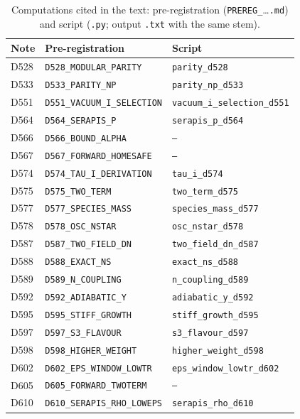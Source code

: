 \documentclass[aps,prd,twocolumn,superscriptaddress,nofootinbib,floatfix]{revtex4-2}
\begin{document}
\begin{table}[tbp]
\caption{Computations cited in the text: pre-registration (\texttt{PREREG\_}\dots\texttt{.md}) and script (\texttt{.py}; output \texttt{.txt} with the same stem).}\label{tab:repro}
\begin{ruledtabular}
\footnotesize
\begin{tabular}{lll}
Note & Pre-registration & Script \\
\hline
D528 & \texttt{D528\_MODULAR\_PARITY} & \texttt{parity\_d528} \\
D533 & \texttt{D533\_PARITY\_NP} & \texttt{parity\_np\_d533} \\
D551 & \texttt{D551\_VACUUM\_I\_SELECTION} & \texttt{vacuum\_i\_selection\_d551} \\
D564 & \texttt{D564\_SERAPIS\_P} & \texttt{serapis\_p\_d564} \\
D566 & \texttt{D566\_BOUND\_ALPHA} & \texttt{---} \\
D567 & \texttt{D567\_FORWARD\_HOMESAFE} & \texttt{---} \\
D574 & \texttt{D574\_TAU\_I\_DERIVATION} & \texttt{tau\_i\_d574} \\
D575 & \texttt{D575\_TWO\_TERM} & \texttt{two\_term\_d575} \\
D577 & \texttt{D577\_SPECIES\_MASS} & \texttt{species\_mass\_d577} \\
D578 & \texttt{D578\_OSC\_NSTAR} & \texttt{osc\_nstar\_d578} \\
D587 & \texttt{D587\_TWO\_FIELD\_DN} & \texttt{two\_field\_dn\_d587} \\
D588 & \texttt{D588\_EXACT\_NS} & \texttt{exact\_ns\_d588} \\
D589 & \texttt{D589\_N\_COUPLING} & \texttt{n\_coupling\_d589} \\
D592 & \texttt{D592\_ADIABATIC\_Y} & \texttt{adiabatic\_y\_d592} \\
D595 & \texttt{D595\_STIFF\_GROWTH} & \texttt{stiff\_growth\_d595} \\
D597 & \texttt{D597\_S3\_FLAVOUR} & \texttt{s3\_flavour\_d597} \\
D598 & \texttt{D598\_HIGHER\_WEIGHT} & \texttt{higher\_weight\_d598} \\
D602 & \texttt{D602\_EPS\_WINDOW\_LOWTR} & \texttt{eps\_window\_lowtr\_d602} \\
D605 & \texttt{D605\_FORWARD\_TWOTERM} & \texttt{---} \\
D610 & \texttt{D610\_SERAPIS\_RHO\_LOWEPS} & \texttt{serapis\_rho\_d610} \\

\end{tabular}
\end{ruledtabular}
\end{table}
\end{document}
